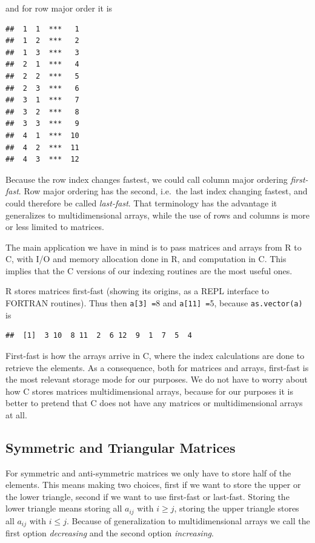 \documentclass[12pt,]{article}
\begin{document}
and for row major order it is

\begin{verbatim}
##  1  1  ***   1 
##  1  2  ***   2 
##  1  3  ***   3 
##  2  1  ***   4 
##  2  2  ***   5 
##  2  3  ***   6 
##  3  1  ***   7 
##  3  2  ***   8 
##  3  3  ***   9 
##  4  1  ***  10 
##  4  2  ***  11 
##  4  3  ***  12
\end{verbatim}

Because the row index changes fastest, we could call column major
ordering \emph{first-fast}. Row major ordering has the second, i.e.~the
last index changing fastest, and could therefore be called
\emph{last-fast}. That terminology has the advantage it generalizes to
multidimensional arrays, while the use of rows and columns is more or
less limited to matrices.

The main application we have in mind is to pass matrices and arrays from
R to C, with I/O and memory allocation done in R, and computation in C.
This implies that the C versions of our indexing routines are the most
useful ones.

R stores matrices first-fast (showing its origins, as a REPL interface
to FORTRAN routines). Thus then \texttt{a{[}3{]}\ =}8 and
\texttt{a{[}11{]}\ =}5, because \texttt{as.vector(a)} is

\begin{verbatim}
##  [1]  3 10  8 11  2  6 12  9  1  7  5  4
\end{verbatim}

First-fast is how the arrays arrive in C, where the index calculations
are done to retrieve the elements. As a consequence, both for matrices
and arrays, first-fast is the most relevant storage mode for our
purposes. We do not have to worry about how C stores matrices
multidimensional arrays, because for our purposes it is better to
pretend that C does not have any matrices or multidimensional arrays at
all.

\subsection{Symmetric and Triangular
Matrices}\label{symmetric-and-triangular-matrices}

For symmetric and anti-symmetric matrices we only have to store half of
the elements. This means making two choices, first if we want to store
the upper or the lower triangle, second if we want to use first-fast or
last-fast. Storing the lower triangle means storing all \(a_{ij}\) with
\(i\geq j\), storing the upper triangle stores all \(a_{ij}\) with
\(i\leq j\). Because of generalization to multidimensional arrays we
call the first option \emph{decreasing} and the second option
\emph{increasing}.
\end{document}
